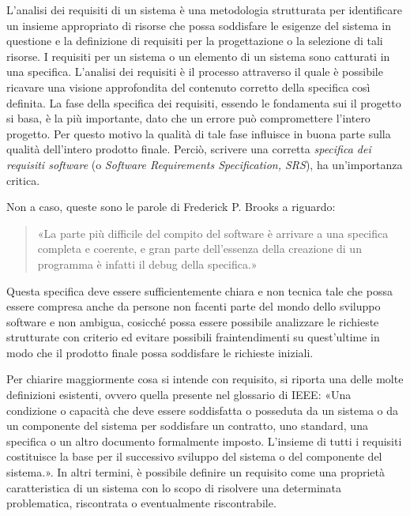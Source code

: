 L'analisi dei requisiti di un sistema è una metodologia strutturata per identificare un insieme appropriato di risorse che possa soddisfare le esigenze del sistema in questione e la definizione di requisiti per la progettazione o la selezione di tali risorse. I requisiti per un sistema o un elemento di un sistema sono catturati in una specifica. L’analisi dei requisiti è il processo attraverso il quale è possibile ricavare una visione approfondita del contenuto corretto della specifica così definita.\cite{system_requirements_analysis}
La fase della specifica dei requisiti, essendo le fondamenta sui il progetto si basa, è la più importante, dato che un errore può compromettere l'intero progetto. Per questo motivo la qualità di tale fase influisce in buona parte sulla qualità dell'intero prodotto finale. Perciò, scrivere una corretta \textit{specifica dei requisiti software} (o \textit{Software Requirements Specification, SRS}), ha un'importanza critica.\cite{researchgate_srs_introduction}

Non a caso, queste sono le parole di Frederick P. Brooks a riguardo:\cite{brooks_srs}

\begin{quote}
    «La parte più difficile del compito del software è arrivare a una specifica completa e coerente, e gran parte dell'essenza della creazione di un programma è infatti il debug della specifica.»
\end{quote}

Questa specifica deve essere sufficientemente chiara e non tecnica tale che possa essere compresa anche da persone non facenti parte del mondo dello sviluppo software e non ambigua, cosicché possa essere possibile analizzare le richieste strutturate con criterio ed evitare possibili fraintendimenti su quest'ultime in modo che il prodotto finale possa soddisfare le richieste iniziali.\cite{researchgate_srs_structure}

Per chiarire maggiormente cosa si intende con requisito, si riporta una delle molte definizioni esistenti, ovvero quella presente nel glossario di IEEE: «Una condizione o capacità che deve essere soddisfatta o posseduta da un sistema o da un componente del sistema per soddisfare un contratto, uno standard, una specifica o un altro documento formalmente imposto. L'insieme di tutti i requisiti costituisce la base per il successivo sviluppo del sistema o del componente del sistema.».\cite{software_requirements} In altri termini, è possibile definire un requisito come una proprietà caratteristica di un sistema con lo scopo di risolvere una determinata problematica, riscontrata o eventualmente riscontrabile.

